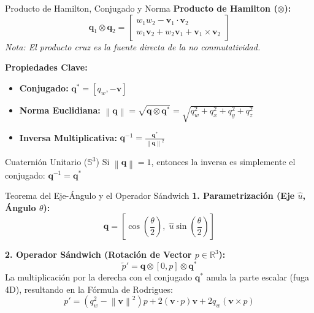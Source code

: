\documentclass[aspectratio=169]{beamer}
\begin{document}
\begin{frame}{Producto de Hamilton, Conjugado y Norma}
    \textbf{Producto de Hamilton ($\otimes$):}
    \begin{equation*}
        \mathbf{q}_1 \otimes \mathbf{q}_2 = \begin{bmatrix} w_1 w_2 - \mathbf{v}_1 \cdot \mathbf{v}_2 \\ w_1 \mathbf{v}_2 + w_2 \mathbf{v}_1 + \mathbf{v}_1 \times \mathbf{v}_2 \end{bmatrix}
    \end{equation*}
    \textit{Nota: El producto cruz es la fuente directa de la no conmutatividad.}
    
    \vspace{0.4cm}
    \textbf{Propiedades Clave:}
    \begin{itemize}
        \item \textbf{Conjugado:} $\mathbf{q}^* = [q_w, -\mathbf{v}]$
        \item \textbf{Norma Euclidiana:} $\left\|\mathbf{q}\right\| = \sqrt{\mathbf{q} \otimes \mathbf{q}^*} = \sqrt{q_w^2 + q_x^2 + q_y^2 + q_z^2}$
        \item \textbf{Inversa Multiplicativa:} $\mathbf{q}^{-1} = \frac{\mathbf{q}^*}{\left\|\mathbf{q}\right\|^2}$
    \end{itemize}
    \vspace{0.1cm}
    \begin{exampleblock}{Cuaternión Unitario ($\mathbb{S}^3$)}
        Si $\left\|\mathbf{q}\right\| = 1$, entonces la inversa es simplemente el conjugado: $\mathbf{q}^{-1} = \mathbf{q}^*$
    \end{exampleblock}
\end{frame}

\begin{frame}{Teorema del Eje-Ángulo y el Operador Sándwich}
    \textbf{1. Parametrización (Eje $\hat{u}$, Ángulo $\theta$):}
    \begin{equation*}
        \mathbf{q} = \left[ \cos\left(\frac{\theta}{2}\right), \; \hat{u} \sin\left(\frac{\theta}{2}\right) \right]
    \end{equation*}
    
    \vspace{0.3cm}
    \textbf{2. Operador Sándwich (Rotación de Vector $p \in \mathbb{R}^3$):}
    \begin{equation*}
        \tilde{p}' = \mathbf{q} \otimes [0, p] \otimes \mathbf{q}^*
    \end{equation*}
    La multiplicación por la derecha con el conjugado $\mathbf{q}^*$ anula la parte escalar (fuga 4D), resultando en la Fórmula de Rodrigues:
    \begin{equation*}
        p' = (q_w^2 - \left\|\mathbf{v}\right\|^2) p + 2(\mathbf{v} \cdot p)\mathbf{v} + 2 q_w (\mathbf{v} \times p)
    \end{equation*}
\end{frame}
\end{document}
